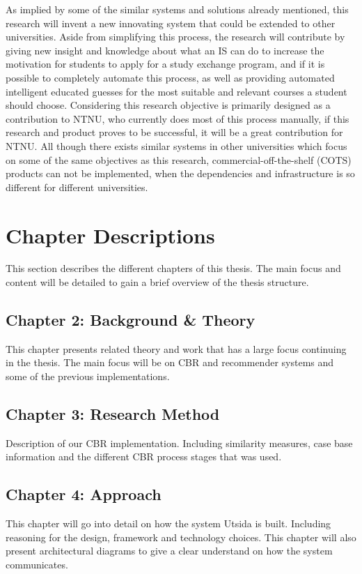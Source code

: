 As implied by some of the similar systems and solutions already mentioned, this research will invent a new innovating system that could be extended to other universities. Aside from simplifying this process, the research will contribute by giving new insight and knowledge about what an IS can do to increase the motivation for students to apply for a study exchange program, and if it is possible to completely automate this process, as well as providing automated intelligent educated guesses for the most suitable and relevant courses a student should choose. Considering this research objective is primarily designed as a contribution to NTNU, who currently does most of this process manually, if this research and product proves to be successful, it will be a great contribution for NTNU. All though there exists similar systems in other universities which focus on some of the same objectives as this research, commercial-off-the-shelf (COTS) products can not be implemented, when the dependencies and infrastructure is so different for different universities.
\fi

\section{Chapter Descriptions}
This section describes the different chapters of this thesis. The main focus and content will be detailed to gain a brief overview of the thesis structure. 

\subsection*{Chapter 2: Background \& Theory}
This chapter presents related theory and work that has a large focus continuing in the thesis. The main focus will be on CBR and recommender systems and some of the previous implementations.  

\subsection*{Chapter 3: Research Method}
Description of our CBR implementation. Including similarity measures, case base information and the different CBR process stages that was used. 

\subsection*{Chapter 4: Approach}
This chapter will go into detail on how the system Utsida is built. Including reasoning for the design, framework and technology choices. This chapter will also present architectural diagrams to give a clear understand on how the system communicates. 

